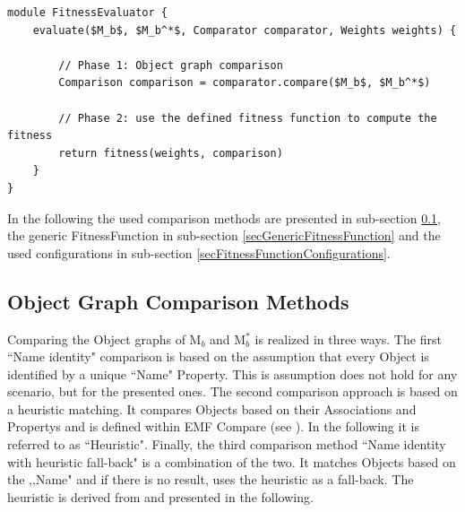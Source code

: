\begin{lstlisting}[language=PSEUDO,caption={Overview of fitness evaluation in pseudo code},label={lstFitnessEvaluatorOverview},mathescape]
module FitnessEvaluator {
	evaluate($M_b$, $M_b^*$, Comparator comparator, Weights weights) {
	
		// Phase 1: Object graph comparison
		Comparison comparison = comparator.compare($M_b$, $M_b^*$)
		
		// Phase 2: use the defined fitness function to compute the fitness
		return fitness(weights, comparison)	
	}
}
\end{lstlisting}

In the following the used comparison methods are presented in sub-section \ref{secObjectGraphComparisonMethods}, the generic \gls{FitnessFunction} in sub-section \ref{secGenericFitnessFunction} and the used configurations in sub-section \ref{secFitnessFunctionConfigurations}.






\subsection{Object Graph Comparison Methods}
\label{secObjectGraphComparisonMethods}

Comparing the \gls{Object} graphs of M$_b$ and M$_b^*$ is realized in three ways. The first ``Name identity" comparison is based on the assumption that every \gls{Object} is identified by a unique ``Name" \gls{Property}. This is assumption does not hold for any scenario, but for the presented ones. The second comparison approach is based on a heuristic matching. It compares \glspl{Object} based on their \glspl{Association} and \glspl{Property} and is defined within EMF Compare (see \cite{EclipseFoundation2014b}). In the following it is referred to as ``Heuristic". Finally, the third comparison method ``Name identity with heuristic fall-back" is a combination of the two. It matches \glspl{Object} based on the ,,Name" and if there is no result, uses the heuristic as a fall-back. The heuristic is derived from \cite{EclipseFoundation2014c} and presented in the following.

